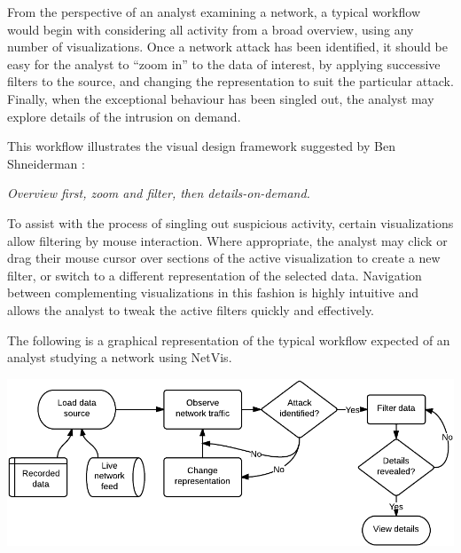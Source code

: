 From the perspective of an analyst examining a network, a typical workflow
would begin with considering all activity from a broad overview, using any
number of visualizations. Once a network attack has been identified, it should
be easy for the analyst to ``zoom in'' to the data of interest, by applying
successive filters to the source, and changing the representation to suit the
particular attack. Finally, when the exceptional behaviour has been singled
out, the analyst may explore details of the intrusion on demand.

This workflow illustrates the visual design framework suggested by Ben
Shneiderman \cite{shneiderman1998designing}:

\begin{center}
    \textit{Overview first, zoom and filter, then details-on-demand.}
\end{center}

To assist with the process of singling out suspicious activity, certain
visualizations allow filtering by mouse interaction. Where appropriate, the
analyst may click or drag their mouse cursor over sections of the active
visualization to create a new filter, or switch to a different representation
of the selected data. Navigation between complementing visualizations in this
fashion is highly intuitive and allows the analyst to tweak the active filters
quickly and effectively.

The following is a graphical representation of the typical workflow expected of
an analyst studying a network using NetVis.

\includegraphics[width=\linewidth]{materials/workflow-diagram.png}
